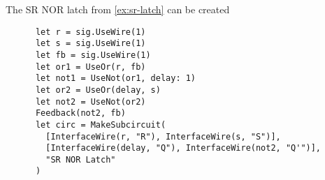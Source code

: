 \begin{example}
    The SR NOR latch from \cref{ex:sr-latch} can be created
    \begin{lstlisting}
      let r = sig.UseWire(1)
      let s = sig.UseWire(1)
      let fb = sig.UseWire(1)
      let or1 = UseOr(r, fb)
      let not1 = UseNot(or1, delay: 1)
      let or2 = UseOr(delay, s)
      let not2 = UseNot(or2)
      Feedback(not2, fb)
      let circ = MakeSubcircuit(
        [InterfaceWire(r, "R"), InterfaceWire(s, "S")],
        [InterfaceWire(delay, "Q"), InterfaceWire(not2, "Q'")],
        "SR NOR Latch"
      )
    \end{lstlisting}
    \begin{center}
        \scalebox{0.3}{}
    \end{center}
\end{example}

